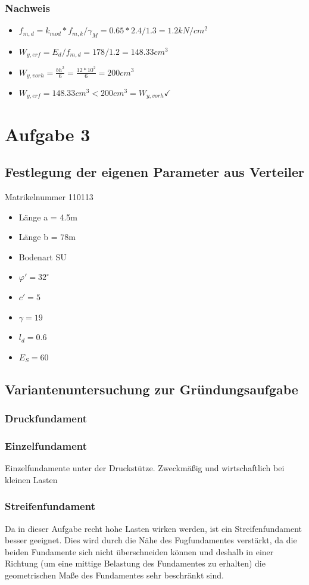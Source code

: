 \documentclass[11pt,fleqn,a4paper,halfparskip]{article}
\begin{document}
\subsubsection*{Nachweis}
\begin{itemize}
\item[] $f_{m,d} = k_{mod} * f_{m,k} / \gamma_M = 0.65*2.4/1.3 = 1.2kN/cm^2$
\item[] $W_{y,erf} = E_d/f_{m,d} = 178/1.2 = 148.33cm^3$
\item[] $W_{y,vorh} = \frac{bh^2}{6} = \frac{12*10^2}{6} = 200cm^3$
\item[] $W_{y,erf} = 148.33cm^3 < 200cm^3 = W_{y,vorh}\checkmark$
\end{itemize}
\newpage
\section{Aufgabe 3}
\subsection*{Festlegung der eigenen Parameter aus Verteiler}
Matrikelnummer 110113
\begin{itemize}
\item Länge a = 4.5m
\item Länge b = 78m
\item Bodenart SU
\item $\varphi' = 32^\circ$
\item $c' = 5$
\item $\gamma = 19$
\item $l_d = 0.6$
\item $E_S = 60$
\end{itemize}
\subsection{Variantenuntersuchung zur Gründungsaufgabe}
\subsubsection{Druckfundament}
\subsubsection*{Einzelfundament}
Einzelfundamente unter der Druckstütze. Zweckmäßig und wirtschaftlich bei kleinen Lasten
\subsubsection*{Streifenfundament}
Da in dieser Aufgabe recht hohe Lasten wirken werden, ist ein Streifenfundament besser geeignet. Dies wird durch die Nähe des Fugfundamentes verstärkt, da die beiden Fundamente sich nicht überschneiden können und deshalb in einer Richtung (um eine mittige Belastung des Fundamentes zu erhalten) die geometrischen Maße des Fundamentes sehr beschränkt sind.
\end{document}
